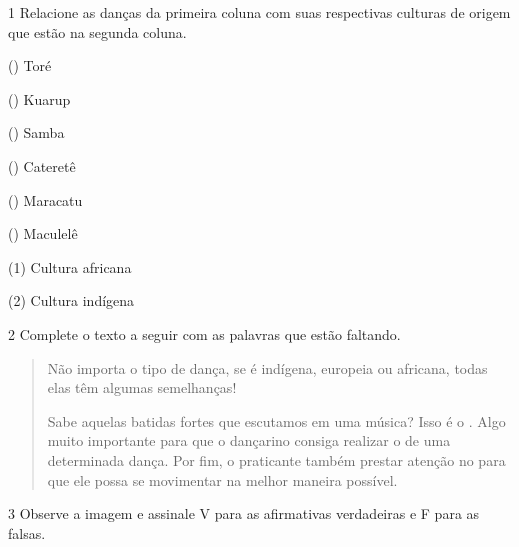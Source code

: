 

\num{1} Relacione as danças da primeira coluna com suas respectivas culturas de
  origem que estão na segunda coluna.

\begin{multicols}{2}
() Toré
    
() Kuarup
    
() Samba

() Cateretê

() Maracatu

() Maculelê

\columnbreak

(1) Cultura africana\medskip

(2) Cultura indígena
\end{multicols}


\num{2} Complete o texto a seguir com as palavras que estão faltando.

\begin{quote}
Não importa o tipo de dança, se é indígena, europeia ou africana, todas
elas têm algumas semelhanças!

Sabe aquelas batidas fortes que escutamos em uma música? Isso é o \preencher{}.
Algo muito importante para que o dançarino consiga realizar o \preencher{} de
uma determinada dança. Por fim, o praticante também prestar atenção no
\preencher{} para que ele possa se movimentar na melhor maneira possível.
\end{quote}


\num{3} Observe a imagem e assinale V para as afirmativas verdadeiras e F para as falsas.

